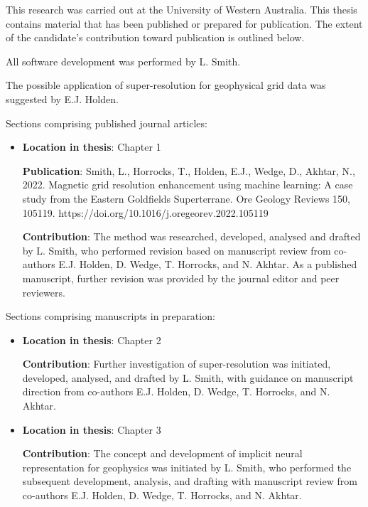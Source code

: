 \documentclass[12pt,a4paper]{report} %
\begin{document}
\newpage{}
This research was carried out at the University of Western Australia.
This thesis contains material that has been published or prepared for publication.
The extent of the candidate's contribution toward publication is outlined below.

\smallskip{}
\noindent{}All software development was performed by L. Smith.

\noindent{}The possible application of super-resolution for geophysical grid data was suggested by E.J. Holden.

\medskip{}
\noindent{}Sections comprising published journal articles:
\begin{itemize}
    \item{}\textbf{Location in thesis}: Chapter 1

          \textbf{Publication}: Smith, L., Horrocks, T., Holden, E.J., Wedge, D., Akhtar, N., 2022. Magnetic grid resolution enhancement using machine learning: A case study from the Eastern Goldfields Superterrane. Ore Geology Reviews 150, 105119. https://doi.org/10.1016/j.oregeorev.2022.105119

          \textbf{Contribution}: The method was researched, developed, analysed and drafted by L. Smith, who performed revision based on manuscript review from co-authors E.J. Holden, D. Wedge, T. Horrocks, and N. Akhtar.
          As a published manuscript, further revision was provided by the journal editor and peer reviewers.
\end{itemize}

\noindent{}Sections comprising manuscripts in preparation:
\begin{itemize}
    \item{}
          \textbf{Location in thesis}: Chapter 2

          \textbf{Contribution}: Further investigation of super-resolution was initiated, developed, analysed, and drafted by L. Smith, with guidance on manuscript direction from co-authors E.J. Holden, D. Wedge, T. Horrocks, and N. Akhtar.

    \item{}
          \textbf{Location in thesis}: Chapter 3

          \textbf{Contribution}: The concept and development of implicit neural representation for geophysics was initiated by L. Smith, who performed the subsequent development, analysis, and drafting with manuscript review from co-authors E.J. Holden, D. Wedge, T. Horrocks, and N. Akhtar.

\end{itemize}
\end{document}
